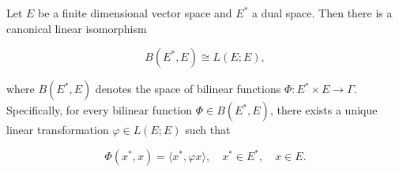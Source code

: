 Let $E$ be a finite dimensional vector space and $E^*$ a dual space. Then there is a canonical linear isomorphism

$$B(E^*, E) \cong L(E; E),$$

where $B(E^*, E)$ denotes the space of bilinear functions $\Phi: E^* \times E \rightarrow \Gamma$. Specifically, for every bilinear function $\Phi \in B(E^*, E)$, there exists a unique linear transformation $\varphi \in L(E; E)$ such that

$$\Phi(x^*, x) = \langle x^*, \varphi x \rangle, \quad x^* \in E^*, \quad x \in E.$$
